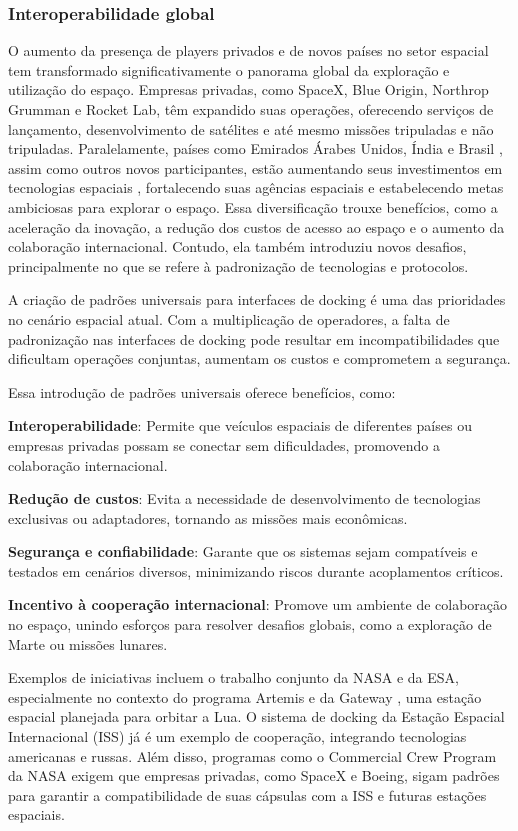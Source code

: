 \subsubsection{Interoperabilidade global}

O aumento da presença de players privados e de novos países no setor espacial tem transformado significativamente o panorama global da exploração e utilização do espaço. Empresas privadas, como SpaceX, Blue Origin, Northrop Grumman e Rocket Lab, têm expandido suas operações, oferecendo serviços de lançamento, desenvolvimento de satélites e até mesmo missões tripuladas e não tripuladas. Paralelamente, países como Emirados Árabes Unidos, Índia e Brasil \cite{senadoALADA}, assim como outros novos participantes, estão aumentando seus investimentos em tecnologias espaciais , fortalecendo suas agências espaciais e estabelecendo metas ambiciosas para explorar o espaço. Essa diversificação trouxe benefícios, como a aceleração da inovação, a redução dos custos de acesso ao espaço \cite{jones2018} e o aumento da colaboração internacional. Contudo, ela também introduziu novos desafios, principalmente no que se refere à padronização de tecnologias e protocolos.

A criação de padrões universais para interfaces \cite{nasaManualOfDocking2017} de docking é uma das prioridades no cenário espacial atual. Com a multiplicação de operadores, a falta de padronização nas interfaces de docking pode resultar em incompatibilidades que dificultam operações conjuntas, aumentam os custos e comprometem a segurança.

Essa introdução de padrões universais oferece benefícios, como:

\textbf{Interoperabilidade}: Permite que veículos espaciais de diferentes países ou empresas privadas possam se conectar sem dificuldades, promovendo a colaboração internacional.

\textbf{Redução de custos}: Evita a necessidade de desenvolvimento de tecnologias exclusivas ou adaptadores, tornando as missões mais econômicas.

\textbf{Segurança e confiabilidade}: Garante que os sistemas sejam compatíveis e testados em cenários diversos, minimizando riscos durante acoplamentos críticos.

\textbf{Incentivo à cooperação internacional}: Promove um ambiente de colaboração no espaço, unindo esforços para resolver desafios globais, como a exploração de Marte ou missões lunares.

Exemplos de iniciativas incluem o trabalho conjunto da NASA e da ESA, especialmente no contexto do programa Artemis e da Gateway \cite{nasaGateway}, uma estação espacial planejada para orbitar a Lua. O sistema de docking da Estação Espacial Internacional (ISS) já é um exemplo de cooperação, integrando tecnologias americanas e russas. Além disso, programas como o Commercial Crew Program da NASA exigem que empresas privadas, como SpaceX e Boeing, sigam padrões para garantir a compatibilidade de suas cápsulas com a ISS e futuras estações espaciais.

